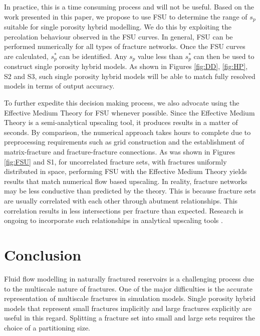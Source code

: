 \documentclass[draft]{agujournal2018}
\begin{document}
In practice, this is a time consuming process and will not be useful. Based on the work presented in this paper, we propose to use FSU to determine the range of $s_p$ suitable for single porosity hybrid modelling. We do this by exploiting the percolation behaviour observed in the FSU curves. In general, FSU can be performed numerically for all types of fracture networks. Once the FSU curves are calculated, $s_p^*$ can be identified. Any $s_p$ value less than $s_p^*$ can then be used to construct single porosity hybrid models. As shown in Figures \ref{fig:DD}, \ref{fig:HP}, S2 and S3, such single porosity hybrid models will be able to match fully resolved models in terms of output accuracy.

To further expedite this decision making process, we also advocate using the Effective Medium Theory for FSU whenever possible. Since the Effective Medium Theory is a semi-analytical upscaling tool, it produces results in a matter of seconds. By comparison, the numerical approach takes hours to complete due to preprocessing requirements such as grid construction and the establishment of matrix-fracture and fracture-fracture connections. As was shown in Figures \ref{fig:FSU} and S1, for uncorrelated fracture sets, with fractures uniformly distributed in space, performing FSU with the Effective Medium Theory yields results that match numerical flow based upscaling. In reality, fracture networks may be less conductive than predicted by the theory. This is because fracture sets are usually correlated with each other through abutment relationships. This correlation results in less intersections per fracture than expected. Research is ongoing to incorporate such relationships in analytical upscaling tools \citep{Hardebol2015, Makel2007, Saevik2017}. 


\section{Conclusion}
Fluid flow modelling in naturally fractured reservoirs is a challenging process due to the multiscale nature of fractures. One of the major difficulties is the accurate representation of multiscale fractures in simulation models. Single porosity hybrid models that represent small fractures implicitly and large fractures explicitly are useful in this regard. Splitting a fracture set into small and large sets requires the choice of a partitioning size.
\end{document}
